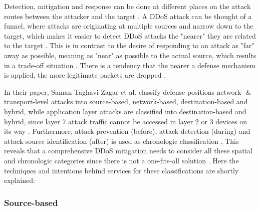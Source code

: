 Detection, mitigation and response can be done at different places on the attack routes between the attacker and the target \cite{DDoS-MitigationSurvey}. A DDoS attack can be thought of a funnel, where attacks are originating at multiple sources and narrow down to the target, which makes it easier to detect DDoS attacks the "nearer" they are related to the target \cite{DDoS-MitigationSurvey}. This is in contrast to the desire of responding to an attack as "far" away as possible, meaning as "near" as possible to the actual source, which results in a trade-off situation \cite{DDoS-MitigationSurvey}. There is a tendency that the nearer a defense mechanism is applied, the more legitimate packets are dropped \cite{DDoS-MitigationSurvey}. 

In their paper, Saman Taghavi Zagar et al. classify defense positions network- \& transport-level attacks into source-based, network-based, destination-based and hybrid, while application layer attacks are classified into destination-based and hybrid, since layer 7 attack traffic cannot be accessed in layer 2 or 3 devices on its way \cite{DDoS-MitigationSurvey}. Furthermore, attack prevention (before), attack detection (during) and attack source identification (after) is used as chronologic classification \cite{DDoS-MitigationSurvey}. This reveals that a comprehensive DDoS mitigation needs to consider all these spatial and chronologic categories since there is not a one-fits-all solution \cite{DDoS-MitigationSurvey}. Here the techniques and intentions behind services for these classifications are shortly explained: 

\subsubsection*{Source-based} 


